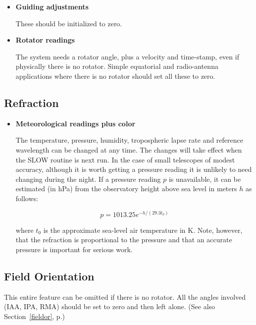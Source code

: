 \documentclass[12pt,fleqn,twoside]{article}
\renewcommand{\_}{{\tt\char'137}}     %
\begin{document}
\begin{itemize}
\item {\bf Guiding adjustments}

      These should be initialized to zero.

\item {\bf Rotator readings}

      The system needs a rotator angle, plus a velocity
      and time-stamp, even if physically there is no
      rotator.  Simple equatorial and radio-antenna
      applications where
      there is no rotator should set all these to zero.

\end{itemize}

\subsection{Refraction}

\begin{itemize}

\item {\bf Meteorological readings plus color}

      The temperature, pressure, humidity, tropospheric lapse rate and
      reference wavelength can be changed at any time.  The
      changes will take effect when the SLOW routine is next
      run.  In the case of
      small telescopes of modest accuracy, although it
      is worth getting a pressure reading it is unlikely to
      need changing during the night.  If a pressure reading $p$
      is unavailable, it can be estimated (in hPa) from the observatory
      height above sea level in meters $h$ as follows:

      \[ p = 1013.25 e^{-h/(29.3 t_0)} \]

      where $t_0$ is the approximate sea-level air temperature in K.
      Note, however, that the refraction is proportional to the
      pressure and that an accurate pressure is important for
      serious work.

\end{itemize}

\subsection{Field Orientation}

This entire feature can be omitted if there is no rotator.
All the angles involved (IAA, IPA, RMA) should be set to
zero and then left alone.  (See also Section~\ref{fieldor},
p\pageref{fieldor}.)
\end{document}
